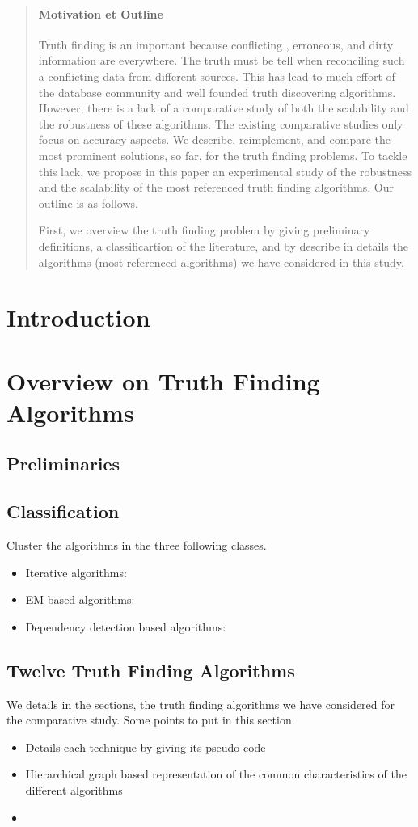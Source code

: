 \documentclass{vldb}
\begin{document}
\begin{abstract}
\paragraph*{Motivation et Outline} Truth finding is an important because conflicting , erroneous, and dirty
information are everywhere. The truth must be tell when reconciling such a conflicting data from different sources. 
This has lead to much effort of the database community and well founded truth discovering algorithms. However, there 
is a lack of a comparative study of both the scalability and the robustness of these algorithms. The existing comparative 
studies only focus on accuracy aspects. We describe, reimplement, and compare the most prominent solutions, so far, 
for the truth finding problems. To tackle this lack, we propose in this paper an experimental study of the robustness
and the scalability of the most referenced truth finding algorithms.  Our outline is as follows.


First, we overview the truth finding problem by giving preliminary definitions, a classificartion of the literature, and
by describe in details the algorithms (most referenced algorithms) we have considered in this study.


\end{abstract}

\section{Introduction}
\section{Overview on Truth Finding Algorithms}
\subsection{Preliminaries}
\subsection{Classification}
Cluster the algorithms in the three following classes.
\begin{itemize}
 \item Iterative algorithms:
 \item EM based algorithms:
 \item Dependency detection based algorithms:
\end{itemize}
\subsection{Twelve Truth Finding Algorithms}
We details in the sections, the truth finding 
algorithms we have considered for the comparative study.
Some points to put in this section.
\begin{itemize}
 \item Details each technique by giving its pseudo-code
 \item Hierarchical graph based representation of the common characteristics
 of the different algorithms
 \item 
\end{itemize}
\end{document}
